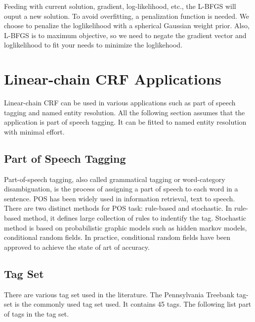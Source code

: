 Feeding with current solution, gradient, log-likelihood, etc., the L-BFGS will ouput a new solution.
To avoid overfitting, a penalization function is needed. We choose to penalize the loglikelihood with a spherical Gaussian weight prior.
Also, L-BFGS is to maximum objective, so we need to negate the gradient vector and loglikelihood to fit your needs to minimize the loglikehood.

\section{Linear-chain CRF Applications}
Linear-chain CRF can be used in various applications such as  part of speech tagging and named entity resolution.
All the following section assumes that the application is part of speech tagging. It can be fitted to named entity resolution with minimal effort. 

\subsection{Part of Speech Tagging}
Part-of-speech tagging, also called grammatical tagging or word-category disambiguation, is the process of assigning 
a part of speech to each word in a sentence. POS has been widely used in information retrieval, text to speech. There are two distinct methods for 
POS task: rule-based and stochastic.
In rule-based method, it defines large collection of rules to indentify the tag. Stochastic method is based on probabilistic 
graphic models such as hidden markov models, conditional random fields. In practice, conditional random fields have been approved 
to achieve the state of art of accuracy.
\subsection{Tag Set}
There are various tag set used in the literature. The Pennsylvania Treebank tag-set is the commonly used tag set used. It contains
45 tags. The following list part of tags in the tag set.

